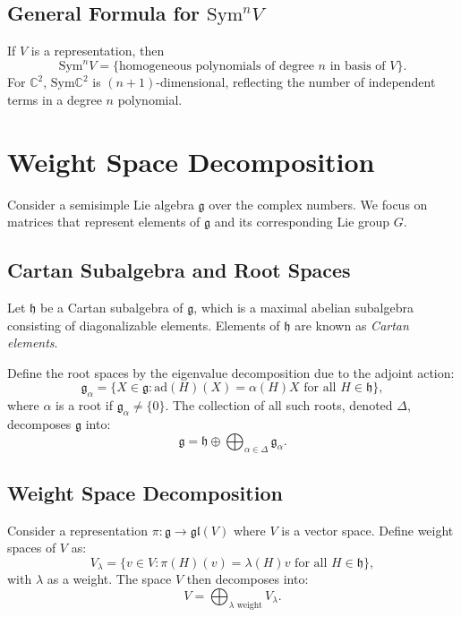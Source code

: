 \documentclass{article}
\begin{document}
\subsection*{General Formula for \( \text{Sym}^n V \)}
If \( V \) is a representation, then
\[
\text{Sym}^n V = \{ \text{homogeneous polynomials of degree } n \text{ in basis of } V \}.
\]
For \( \mathbb{C}^2 \), \( \text{Sym} \mathbb{C}^2 \) is \( (n+1) \)-dimensional, reflecting the number of independent terms in a degree \( n \) polynomial.

\section{Weight Space Decomposition}

Consider a semisimple Lie algebra \(\mathfrak{g}\) over the complex numbers. We focus on matrices that represent elements of \(\mathfrak{g}\) and its corresponding Lie group \(G\).

\subsection*{Cartan Subalgebra and Root Spaces}

Let \(\mathfrak{h}\) be a Cartan subalgebra of \(\mathfrak{g}\), which is a maximal abelian subalgebra consisting of diagonalizable elements. Elements of \(\mathfrak{h}\) are known as \emph{Cartan elements}.

Define the root spaces by the eigenvalue decomposition due to the adjoint action:
\[
\mathfrak{g}_\alpha = \{ X \in \mathfrak{g} : \text{ad}(H)(X) = \alpha(H)X \text{ for all } H \in \mathfrak{h} \},
\]
where \(\alpha\) is a root if \(\mathfrak{g}_\alpha \neq \{0\}\). The collection of all such roots, denoted \(\Delta\), decomposes \(\mathfrak{g}\) into:
\[
\mathfrak{g} = \mathfrak{h} \oplus \bigoplus_{\alpha \in \Delta} \mathfrak{g}_\alpha.
\]

\subsection*{Weight Space Decomposition}

Consider a representation \(\pi: \mathfrak{g} \rightarrow \mathfrak{gl}(V)\) where \(V\) is a vector space. Define weight spaces of \(V\) as:
\[
V_\lambda = \{ v \in V : \pi(H)(v) = \lambda(H)v \text{ for all } H \in \mathfrak{h} \},
\]
with \(\lambda\) as a weight. The space \(V\) then decomposes into:
\[
V = \bigoplus_{\lambda \text{ weight}} V_\lambda.
\]
\end{document}
